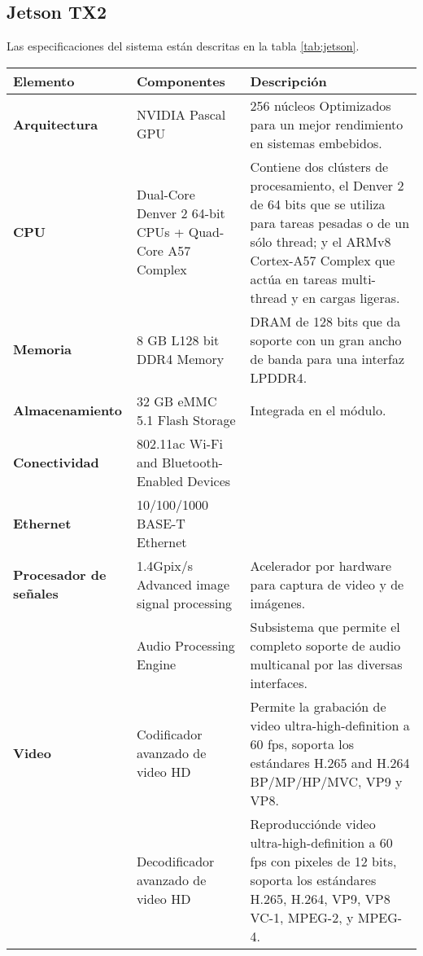  \subsection{Jetson TX2}
 
    Las especificaciones del sistema están descritas en la tabla \ref{tab:jetson}.

    \begin{table}[h!]
      \begin{center}
            \scriptsize
        \begin{tabular}{|m{2.5cm}|m{6cm}|m{6.5cm}|}
         \hline
        \cellcolor{lightgray}\textbf{Elemento} & \cellcolor{lightgray} \textbf{Componentes} & \cellcolor{lightgray} \textbf{Descripción}\\ 
         \hline
         \textbf{Arquitectura} & NVIDIA Pascal GPU & 256 núcleos Optimizados para un mejor rendimiento en sistemas embebidos.\\
         \hline
         \textbf{CPU} & Dual-Core Denver 2 64-bit CPUs + Quad-Core A57 Complex & Contiene dos clústers de procesamiento, el Denver 2 de 64 bits que se utiliza para tareas pesadas o de un sólo thread; y el ARMv8 Cortex-A57 Complex que actúa en tareas multi-thread y en cargas ligeras.\\
         \hline
         \textbf{Memoria} & 8 GB L128 bit DDR4 Memory & DRAM de 128 bits que da soporte con un gran ancho de banda para una interfaz LPDDR4.  \\
          \hline
    	\textbf{Almacenamiento} & 32 GB eMMC 5.1 Flash Storage & Integrada en el módulo.\\
         \hline
    	\textbf{Conectividad} & 802.11ac Wi-Fi and Bluetooth-Enabled Devices & \\
         \hline
   	 \textbf{Ethernet} &10/100/1000 BASE-T Ethernet & \\
	  \hline
   	 \textbf{Procesador de señales} &1.4Gpix/s Advanced image signal processing & Acelerador por hardware para captura de video y de imágenes.\\
	 &Audio Processing Engine & Subsistema que permite el completo soporte de audio multicanal por las diversas interfaces.\\
	 \hline
   	 \textbf{Video} & Codificador avanzado de video HD & Permite la grabación de video ultra-high-definition a 60 fps, soporta los estándares H.265 and H.264 BP/MP/HP/MVC, VP9 y VP8. \\
	  & Decodificador avanzado de video HD & Reproducciónde video ultra-high-definition a 60 fps con pixeles de 12 bits, soporta los estándares H.265, H.264, VP9, VP8 VC-1, MPEG-2, y MPEG-4. \\

\end{tabular}
\end{center}
\end{table}
